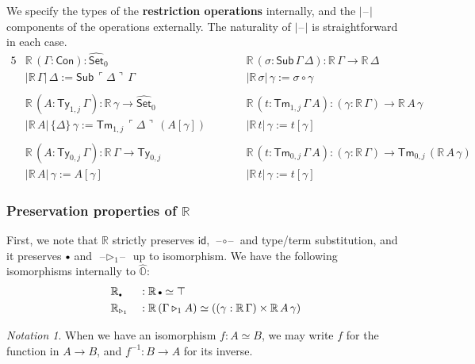 \documentclass[acmsmall,anonymous,review]{acmart}
\newcommand{\msf}[1]{\mathsf{#1}}
\newcommand{\mbb}[1]{\mathbb{#1}}
\newcommand{\wh}[1]{\widehat{#1}}
\newcommand{\ext}{\triangleright}
\newcommand{\mbbo}{\mbb{O}}
\newcommand{\Con}{\msf{Con}}
\newcommand{\Sub}{\msf{Sub}}
\newcommand{\Ty}{\msf{Ty}}
\newcommand{\Tm}{\msf{Tm}}
\newcommand{\emptycon}{\scaleobj{.75}\bullet}
\newcommand{\id}{\msf{id}}
\newcommand{\Set}{\mathsf{Set}}
\newcommand{\blank}{{\mathord{\hspace{1pt}\text{--}\hspace{1pt}}}}
\newcommand{\emb}[1]{\ulcorner#1\urcorner}
\newcommand{\hato}{\bm\hat{\mbbo}}
\newcommand{\re}{\mbb{R}}
\theoremstyle{remark}
\newtheorem{notation}{Notation}
\newcommand{\whset}{\wh{\Set}}
\begin{document}
\begin{definition}\label{def:restriction} We specify the types of the \textbf{restriction operations} internally, and the $|\blank|$
components of the operations externally. The naturality of $|\blank|$ is
straightforward in each case.
\begingroup
\begin{alignat*}{5}
  & \re\,(\Gamma : \Con) : \whset_0 && \re\,(\sigma : \Sub\,\Gamma\,\Delta) : \re\,\Gamma \to \re\,\Delta \\
  & |\re\,\Gamma|\,\Delta := \Sub\,\emb{\Delta}\,\Gamma && |\re\,\sigma|\,\gamma := \sigma \circ \gamma \\
  & \\
  & \re\,(A : \Ty_{1,j}\,\Gamma) : \re\,\gamma \to \whset_0 && \re\,(t : \Tm_{1,j}\,\Gamma\,A) : (\gamma : \re\,\Gamma) \to \re\,A\,\gamma \\
  & |\re\,A|\,\{\Delta\}\,\gamma := \Tm_{1,j}\,\emb{\Delta}\,(A[\gamma])\hspace{2em} && |\re\,t|\,\gamma := t[\gamma]\\
  & \\
  & \re\,(A : \Ty_{0,j}\,\Gamma) : \re\,\Gamma \to \Ty_{0,j}\hspace{2em} && \re\,(t : \Tm_{0,j}\,\Gamma\,A) : (\gamma : \re\,\Gamma) \to \Tm_{0,j}\,(\re\,A\,\gamma)\\
  & |\re\,A|\,\gamma := A[\gamma] && |\re\,t|\,\gamma := t[\gamma]
\end{alignat*}
\endgroup
\end{definition}

\subsubsection{Preservation properties of $\re$}
First, we note that $\re$ strictly preserves $\id$, $\blank\circ\blank$ and
type/term substitution, and it preserves $\emptycon$ and $\blank\ext_1\blank$ up
to isomorphism. We have the following isomorphisms internally to $\hato$:
\begin{alignat*}{3}
  & \re_{\emptycon} &&: \re\,\emptycon \simeq \top \\
  & \re_{\ext_1}   &&: \re\,(\Gamma \ext_1 A) \simeq ((\gamma : \re\,\Gamma) \times \re\,A\,\gamma)
\end{alignat*}

\begin{notation} When we have an isomorphism $f : A \simeq B$, we may write $f$ for the
  function in $A \to B$, and $f^{-1} : B \to A$ for its inverse.
\end{notation}
\end{document}
